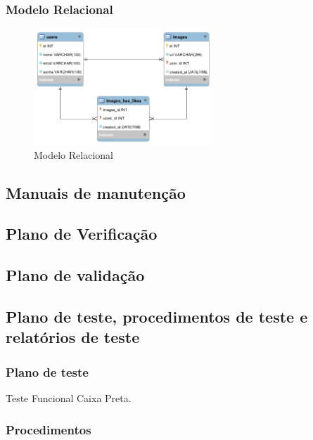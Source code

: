 \pagebreak

\subsubsection{Modelo Relacional} 
\begin{figure}[ht]
	\centering
	\includegraphics[width=0.6\textwidth]{./imagens/der.png}
	\caption{Modelo Relacional}
	\label{fig:modeloRelacional}
\end{figure}

\pagebreak

\subsection{Manuais de manutenção}

\subsection{Plano de Verificação}

\subsection{Plano de validação}

\subsection{Plano de teste, procedimentos de teste e relatórios de teste}

\subsubsection{Plano de teste}

Teste Funcional Caixa Preta.

\subsubsection{Procedimentos}

